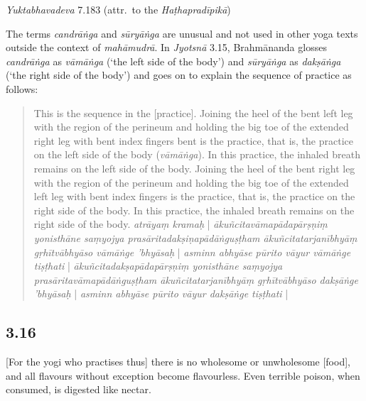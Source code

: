 \begin{ekdosis}
\begin{testimonia}[hp03_015]
\emph{Yuktabhavadeva} 7.183 (attr.~to the \emph{Haṭhapradīpikā})
\begin{versinnote}
\end{versinnote}
\end{testimonia}

\begin{philcomm}[hp03_015]
The terms \emph{candrāṅga} and \emph{sūryāṅga} are unusual and not used in other yoga texts outside the context of \emph{mahāmudrā}. In \emph{Jyotsnā} 3.15, Brahmānanda glosses \emph{candrāṅga} as \emph{vāmāṅga} (`the left side of the body') and \emph{sūryāṅga} as \emph{dakṣāṅga} (`the right side of the body') and goes on to explain the sequence of practice as follows:

\begin{quote}
This is the sequence in the [practice]. Joining the heel of the bent left leg with the region of the perineum and holding the big toe of the extended right leg with bent index fingers bent is the practice, that is, the practice on the left side of the body (\emph{vāmāṅga}). In this practice, the inhaled breath remains on the left side of the body. Joining the heel of the bent right leg with the region of the perineum and holding the big toe of the extended left leg with bent index fingers is the practice, that is, the practice on the right side of the body. In this practice, the inhaled breath remains on the right side of the body.
\emph{atrāyaṃ kramaḥ} | \emph{ākuñcitavāmapādapārṣṇiṃ yonisthāne saṃyojya prasāritadakṣiṇapādāṅguṣṭham ākuñcitatarjanībhyāṃ gṛhītvābhyāso vāmāṅge 'bhyāsaḥ} | \emph{asminn abhyāse pūrito vāyur vāmāṅge tiṣṭhati} | \emph{ākuñcita\-dakṣa\-pāda\-pārṣṇiṃ yonisthāne saṃyojya prasārita\-vāma\-pādā\-ṅguṣṭham ākuñcita\-tarjanībhyāṃ gṛhītvābhyāso dakṣāṅge 'bhyāsaḥ} | \emph{asminn abhyāse pūrito vāyur dakṣāṅge tiṣṭhati} |
\end{quote}

\end{philcomm}

\subsection*{3.16}
\begin{translation}[hp03_016]
{}[For the yogi who practises thus] there is no wholesome or unwholesome [food], and all flavours without exception become flavourless. Even terrible poison, when consumed, is digested like nectar.
\end{translation}


\end{ekdosis}
